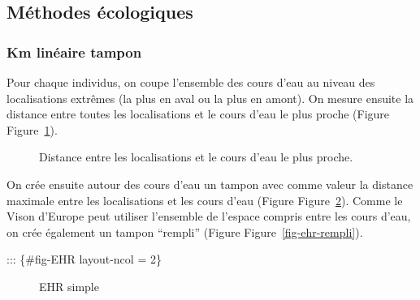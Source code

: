 \documentclass[
  letterpaper,
  DIV=11,
  numbers=noendperiod]{scrreprt}
\begin{document}
\subsection{Méthodes écologiques}\label{muxe9thodes-uxe9cologiques}

\subsubsection{Km linéaire tampon}\label{km-linuxe9aire-tampon}

Pour chaque individus, on coupe l'ensemble des cours d'eau au niveau des
localisations extrêmes (la plus en aval ou la plus en amont). On mesure
ensuite la distance entre toutes les localisations et le cours d'eau le
plus proche (Figure Figure~\ref{fig-distance}).

\begin{figure}


\caption{\label{fig-distance}Distance entre les localisations et le
cours d'eau le plus proche.}

\end{figure}%

On crée ensuite autour des cours d'eau un tampon avec comme valeur la
distance maximale entre les localisations et les cours d'eau (Figure
Figure~\ref{fig-ehr-simple}). Comme le Vison d'Europe peut utiliser
l'ensemble de l'espace compris entre les cours d'eau, on crée également
un tampon ``rempli'' (Figure Figure~\ref{fig-ehr-rempli}).

::: \{\#fig-EHR layout-ncol = 2\}

\begin{figure}


\caption{\label{fig-ehr-simple}EHR simple}

\end{figure}%
\end{document}
